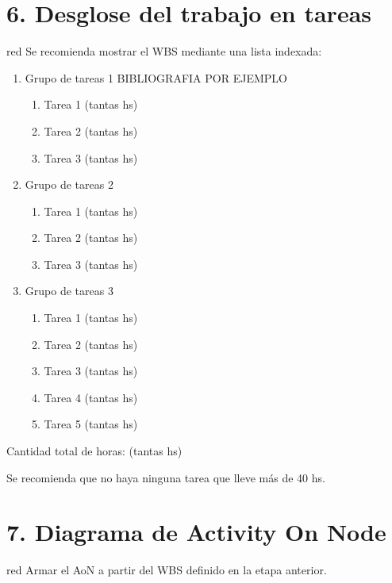 \documentclass[11pt]{charter}
\begin{document}
\section{6. Desglose del trabajo en tareas}
\label{sec:wbs}

\begin{consigna}{red}
Se recomienda mostrar el WBS mediante una lista indexada:

\begin{enumerate}
\item Grupo de tareas 1 BIBLIOGRAFIA POR EJEMPLO
	\begin{enumerate}
	\item Tarea 1 (tantas hs)
	\item Tarea 2 (tantas hs)
	\item Tarea 3 (tantas hs)
	\end{enumerate}
\item Grupo de tareas 2
	\begin{enumerate}
	\item Tarea 1 (tantas hs)
	\item Tarea 2 (tantas hs)
	\item Tarea 3 (tantas hs)
	\end{enumerate}
	\item Grupo de tareas 3
	\begin{enumerate}
	\item Tarea 1 (tantas hs)
	\item Tarea 2 (tantas hs)
	\item Tarea 3 (tantas hs)
	\item Tarea 4 (tantas hs)
	\item Tarea 5 (tantas hs)
	\end{enumerate}
\end{enumerate}

Cantidad total de horas: (tantas hs)

Se recomienda que no haya ninguna tarea que lleve más de 40 hs. 

\end{consigna}

\section{7. Diagrama de Activity On Node}
\label{sec:AoN}

\begin{consigna}{red}
Armar el AoN a partir del WBS definido en la etapa anterior. 



\end{consigna}
\end{document}
